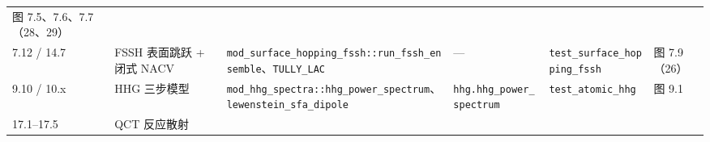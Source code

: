 \documentclass[
]{ctexbook}
\begin{document}
\begin{longtable}[]{@{}llllll@{}}
\begin{minipage}[t]{0.14\columnwidth}
图 7.5、7.6、7.7（28、29）\strut
\end{minipage}\tabularnewline
\begin{minipage}[t]{0.14\columnwidth}\raggedright
7.12 / 14.7\strut
\end{minipage} & \begin{minipage}[t]{0.14\columnwidth}\raggedright
FSSH 表面跳跃 + 闭式 NACV\strut
\end{minipage} & \begin{minipage}[t]{0.14\columnwidth}\raggedright
\texttt{mod\_surface\_hopping\_fssh::run\_fssh\_ensemble}、\texttt{TULLY\_LAC}\strut
\end{minipage} & \begin{minipage}[t]{0.14\columnwidth}\raggedright
---\strut
\end{minipage} & \begin{minipage}[t]{0.14\columnwidth}\raggedright
\texttt{test\_surface\_hopping\_fssh}\strut
\end{minipage} & \begin{minipage}[t]{0.14\columnwidth}\raggedright
图 7.9（26）\strut
\end{minipage}\tabularnewline
\begin{minipage}[t]{0.14\columnwidth}\raggedright
9.10 / 10.x\strut
\end{minipage} & \begin{minipage}[t]{0.14\columnwidth}\raggedright
HHG 三步模型\strut
\end{minipage} & \begin{minipage}[t]{0.14\columnwidth}\raggedright
\texttt{mod\_hhg\_spectra::hhg\_power\_spectrum}、\texttt{lewenstein\_sfa\_dipole}\strut
\end{minipage} & \begin{minipage}[t]{0.14\columnwidth}\raggedright
\texttt{hhg.hhg\_power\_spectrum}\strut
\end{minipage} & \begin{minipage}[t]{0.14\columnwidth}\raggedright
\texttt{test\_atomic\_hhg}\strut
\end{minipage} & \begin{minipage}[t]{0.14\columnwidth}\raggedright
图 9.1\strut
\end{minipage}\tabularnewline
\begin{minipage}[t]{0.14\columnwidth}\raggedright
17.1--17.5\strut
\end{minipage} & \begin{minipage}[t]{0.14\columnwidth}\raggedright
QCT 反应散射\strut
\end{minipage} & \begin{minipage}[t]{0.14\columnwidth}\raggedright

\end{minipage}
\end{longtable}
\end{document}
